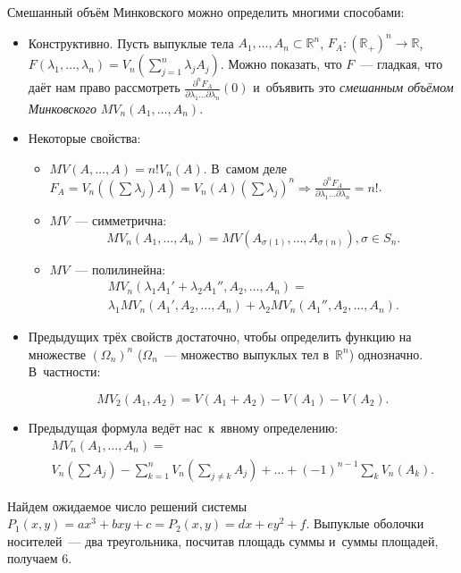 \documentclass{article}
\begin{document}
Смешанный объём Минковского можно определить многими способами:
\begin{itemize}
	\item Конструктивно. Пусть выпуклые тела $A_1, \ldots, A_n \subset
		\mathbb{R}^n$, $F_A: (\mathbb{R}_+)^n \rightarrow \mathbb{R}$, $F(\lambda_1,
		\ldots, \lambda_n) = V_n(\sum\limits_{j=1}^n \lambda_j A_j)$. Можно
		показать, что $F$~--- гладкая, что даёт нам право рассмотреть
		$\frac{\partial^n F_A}{\partial \lambda_1 \ldots \partial \lambda_n}(0)$
		и~объявить это \emph{смешанным объёмом Минковского} $MV_n(A_1, \ldots,
		A_n)$.
	\item Некоторые свойства:
		\begin{itemize}
			\item $MV(A, \ldots, A) = n! V_n(A)$. В~самом деле~$F_A = V_n((\sum
				\lambda_j) A) = V_n(A) (\sum \lambda_j)^n \Rightarrow
				\frac{\partial^n F_A}{\partial \lambda_1 \ldots \partial \lambda_n} =
				n!$.
			\item $MV$~--- симметрична:
				$$MV_n(A_1, \ldots, A_n) = MV(A_{\sigma(1)}, \ldots, A_{\sigma(n)}),
				\sigma \in S_n.$$
			\item $MV$~--- полилинейна:
				\begin{multline*}
					MV_n(\lambda_1 A_1' + \lambda_2 A_1'', A_2, \ldots, A_n) =\\
					\lambda_1 MV_n(A_1', A_2, \ldots, A_n) + \lambda_2 MV_n(A_1'', A_2,
					\ldots, A_n).
				\end{multline*}
		\end{itemize}
	\item Предыдущих трёх свойств достаточно, чтобы определить функцию на
		множестве $(\Omega_n)^n$ ($\Omega_n$~--- множество выпуклых тел
		в~$\mathbb{R}^n$) однозначно. В~частности:

		$$MV_2(A_1, A_2) = V(A_1 + A_2) - V(A_1) - V(A_2).$$
	\item Предыдущая формула ведёт нас~к~явному определению:
		\begin{multline*}
			MV_n(A_1, \ldots, A_n) = \\
			V_n\left(\sum A_j\right) - \sum_{k=1}^n V_n\left(\sum_{j \ne k} A_j\right)
			+ \ldots + (-1)^{n-1}\sum_k V_n(A_k).
		\end{multline*}
\end{itemize}

\begin{example}
	Найдем ожидаемое число решений системы $P_1(x, y) = ax^3 + bxy + c =
	P_2(x, y) = dx + ey^2 + f$. Выпуклые оболочки носителей~--- два треугольника,
	посчитав площадь суммы и~суммы площадей, получаем 6.
\end{example}
\end{document}
